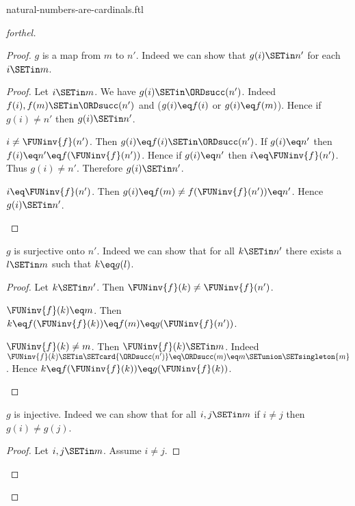 \documentclass{stex}
\begin{document}
\begin{smodule}{natural-numbers-are-cardinals.ftl}
\begin{proof}[forthel]
\begin{proof}
      $g$ is a map from $m$ to $n'$.
      Indeed we can show that $g(i) \SETin n'$ for each $i \SETin m$.
      \begin{proof}
        Let $i \SETin m$.
        We have $g(i) \SETin \ORDsucc(n')$.
        Indeed $f(i), f(m) \SETin \ORDsucc(n')$ and ($g(i) \eq f(i)$ or $g(i) \eq f(m)$).
        Hence if $g(i) \neq n'$ then $g(i) \SETin n'$.

        \begin{case}{$i \neq \FUNinv{f}(n')$.}
          Then $g(i) \eq f(i) \SETin \ORDsucc(n')$.
          If $g(i) \eq n'$ then $f(i) \eq n' \eq f(\FUNinv{f}(n'))$.
          Hence if $g(i) \eq n'$ then $i \eq \FUNinv{f}(n')$.
          Thus $g(i) \neq n'$.
          Therefore $g(i) \SETin n'$.
        \end{case}

        \begin{case}{$i \eq \FUNinv{f}(n')$.}
          Then $g(i)
            \eq f(m)
            \neq f(\FUNinv{f}(n'))
            \eq n'$.
          Hence $g(i) \SETin n'$.
        \end{case}
      \end{proof}

      $g$ is surjective onto $n'$.
      Indeed we can show that for all $k \SETin n'$ there exists a $l \SETin m$ such that $k \eq g(l)$.
      \begin{proof}
        Let $k \SETin n'$.
        Then $\FUNinv{f}(k) \neq \FUNinv{f}(n')$.

        \begin{case}{$\FUNinv{f}(k) \eq m$.}
          Then $k
            \eq f(\FUNinv{f}(k))
            \eq f(m)
            \eq g(\FUNinv{f}(n'))$.
        \end{case}

        \begin{case}{$\FUNinv{f}(k) \neq m$.}
          Then $\FUNinv{f}(k) \SETin m$.
          Indeed $\FUNinv{f}(k) \SETin \SETcard{\ORDsucc(n')} \eq \ORDsucc(m) \eq m \SETunion \SETsingleton{m}$.
          Hence $k
            \eq f(\FUNinv{f}(k))
            \eq g(\FUNinv{f}(k))$.
        \end{case}
      \end{proof}

      $g$ is injective.
      Indeed we can show that for all $i, j \SETin m$ if $i \neq j$ then $g(i) \neq g(j)$.
      \begin{proof}
        Let $i, j \SETin m$.
        Assume $i \neq j$.


\end{proof}
\end{proof}
\end{proof}
\end{smodule}
\end{document}
